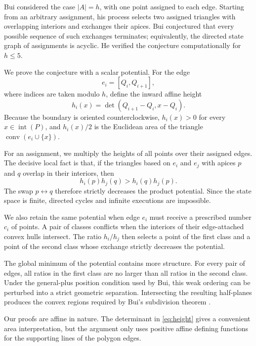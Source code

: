 \documentclass[final,5p,times,twocolumn]{elsarticle}
\theoremstyle{definition}
\theoremstyle{remark}
\newcommand{\interior}[1]{\operatorname{int}(#1)}
\newcommand{\conv}{\operatorname{conv}}
\newcommand{\height}{h}
\begin{document}
Bui \cite[Section~8.2]{Bui2025} considered the case $|A|=h$, with one point assigned to each edge. Starting from an arbitrary assignment, his process selects two assigned triangles with overlapping interiors and exchanges their apices. Bui conjectured that every possible sequence of such exchanges terminates; equivalently, the directed state graph of assignments is acyclic. He verified the conjecture computationally for $h\leq 5$.

We prove the conjecture with a scalar potential. For the edge
\[
e_i=[Q_i,Q_{i+1}],
\]
where indices are taken modulo $h$, define the inward affine height
\begin{equation}
\height_i(x)=\det(Q_{i+1}-Q_i,x-Q_i).
\label{eq:height}
\end{equation}
Because the boundary is oriented counterclockwise, $\height_i(x)>0$ for every $x\in\interior P$, and $\height_i(x)/2$ is the Euclidean area of the triangle $\conv(e_i\cup\{x\})$.

For an assignment, we multiply the heights of all points over their assigned edges. The decisive local fact is that, if the triangles based on $e_i$ and $e_j$ with apices $p$ and $q$ overlap in their interiors, then
\begin{equation}
\height_i(p)\height_j(q)>
\height_i(q)\height_j(p).
\label{eq:local-product-intro}
\end{equation}
The swap $p\leftrightarrow q$ therefore strictly decreases the product potential. Since the state space is finite, directed cycles and infinite executions are impossible.

We also retain the same potential when edge $e_i$ must receive a prescribed number $c_i$ of points. A pair of classes conflicts when the interiors of their edge-attached convex hulls intersect. The ratio $\height_i/\height_j$ then selects a point of the first class and a point of the second class whose exchange strictly decreases the potential.

The global minimum of the potential contains more structure. For every pair of edges, all ratios in the first class are no larger than all ratios in the second class. Under the general-plus position condition used by Bui, this weak ordering can be perturbed into a strict geometric separation. Intersecting the resulting half-planes produces the convex regions required by Bui's subdivision theorem \cite[Theorem~4.1]{Bui2025}.

Our proofs are affine in nature. The determinant in \eqref{eq:height} gives a convenient area interpretation, but the argument only uses positive affine defining functions for the supporting lines of the polygon edges.
\end{document}
